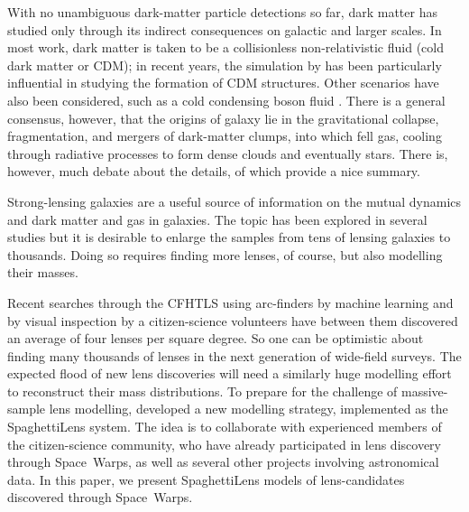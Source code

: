 \documentclass[fleqn,usenatbib]{mnras}
\begin{document}
With no unambiguous dark-matter particle detections so far, dark
matter has studied only through its indirect consequences on galactic
and larger scales.  In most work, dark matter is taken to be a
collisionless non-relativistic fluid (cold dark matter or CDM); in
recent years, the simulation by \cite{2005Natur.435..629S} has been
particularly influential in studying the formation of CDM structures.
Other scenarios have also been considered, such as a cold condensing
boson fluid \citep{2016ApJ...818...89S}.  There is a general
consensus, however, that the origins of galaxy lie in the
gravitational collapse, fragmentation, and mergers of dark-matter
clumps, into which fell gas, cooling through radiative processes to
form dense clouds and eventually stars.  There is, however, much
debate about the details, of which \cite{2012RAA....12..917S} provide
a nice summary.

Strong-lensing galaxies are a useful source of information on the
mutual dynamics and dark matter and gas in galaxies.  The topic has
been explored in several studies
\citep{2009ApJ...703L..51K,2011ApJ...740...97L,2012MNRAS.424..104L,
  2016MNRAS.459.3677L,2016MNRAS.456..870B} but it is desirable to
enlarge the samples from tens of lensing galaxies to thousands.  Doing
so requires finding more lenses, of course, but also modelling their
masses.

Recent searches through the CFHTLS \citep{2012SPIE.8448E..0MC} using
arc-finders
\citep{2012ApJ...749...38M,2014A&A...567A.111M,2014ApJ...785..144G} by
machine learning \citep{2016arXiv160504309P} and by visual inspection
by a citizen-science volunteers
\citep[Space~Warps][]{2016MNRAS.455.1191M} have between them
discovered an average of four lenses per square degree.  So one can be
optimistic about finding many thousands of lenses in the next
generation of wide-field surveys.  The expected flood of new lens
discoveries will need a similarly huge modelling effort to
reconstruct their mass distributions.  To prepare for the challenge of
massive-sample lens modelling, \cite{2015MNRAS.447.2170K} developed a
new modelling strategy, implemented as the SpaghettiLens system.  The
idea is to collaborate with experienced members of the citizen-science
community, who have already participated in lens discovery through
Space~Warps, as well as several other projects involving astronomical
data.  In this paper, we present SpaghettiLens models of
lens-candidates discovered through Space~Warps.
\end{document}
